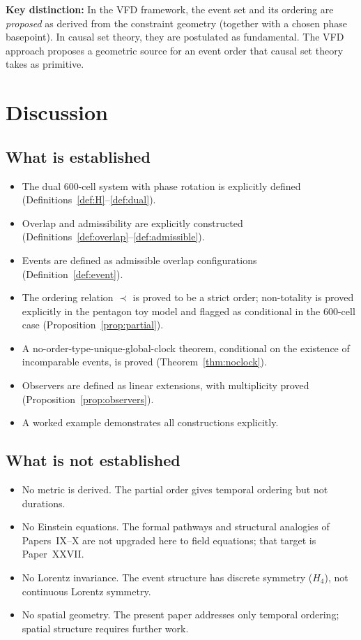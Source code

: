 \documentclass[12pt]{article}
\begin{document}
\textbf{Key distinction:} In the VFD framework, the event set and its ordering are \emph{proposed} as derived from the constraint geometry (together with a chosen phase basepoint). In causal set theory, they are postulated as fundamental. The VFD approach proposes a geometric source for an event order that causal set theory takes as primitive.

\section{Discussion}\label{sec:discussion}

\subsection{What is established}

\begin{itemize}
    \item The dual 600-cell system with phase rotation is explicitly defined (Definitions~\ref{def:H}--\ref{def:dual}).
    \item Overlap and admissibility are explicitly constructed (Definitions~\ref{def:overlap}--\ref{def:admissible}).
    \item Events are defined as admissible overlap configurations (Definition~\ref{def:event}).
    \item The ordering relation $\prec$ is proved to be a strict order; non-totality is proved explicitly in the pentagon toy model and flagged as conditional in the 600-cell case (Proposition~\ref{prop:partial}).
    \item A no-order-type-unique-global-clock theorem, conditional on the existence of incomparable events, is proved (Theorem~\ref{thm:noclock}).
    \item Observers are defined as linear extensions, with multiplicity proved (Proposition~\ref{prop:observers}).
    \item A worked example demonstrates all constructions explicitly.
\end{itemize}

\subsection{What is not established}

\begin{itemize}
    \item No metric is derived. The partial order gives temporal ordering but not durations.
    \item No Einstein equations. The formal pathways and structural analogies of Papers~IX--X are not upgraded here to field equations; that target is Paper~XXVII.
    \item No Lorentz invariance. The event structure has discrete symmetry ($H_4$), not continuous Lorentz symmetry.
    \item No spatial geometry. The present paper addresses only temporal ordering; spatial structure requires further work.
\end{itemize}
\end{document}
